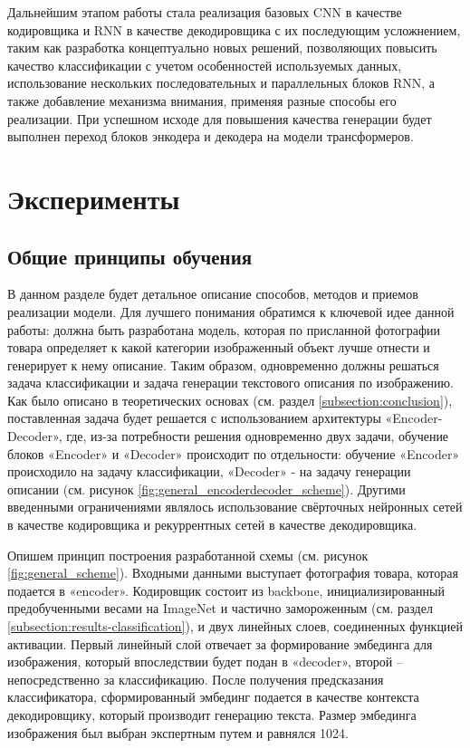 \documentclass[a4paper,12pt]{extarticle}
\begin{document}
Дальнейшим этапом работы стала реализация базовых CNN в качестве кодировщика и RNN в качестве декодировщика с их последующим усложнением, таким как разработка концептуально новых решений, позволяющих повысить качество классификации с учетом особенностей используемых данных, использование нескольких последовательных и параллельных блоков RNN, а также добавление механизма внимания, применяя разные способы его реализации. При успешном исходе для повышения качества генерации будет выполнен переход блоков энкодера и декодера на модели трансформеров.



\newpage
\section{Эксперименты}

\subsection{Общие принципы обучения}

В данном разделе будет детальное описание способов, методов и приемов реализации модели. Для лучшего понимания обратимся к ключевой идее данной работы: должна быть разработана модель, которая по присланной фотографии товара определяет к какой категории изображенный объект лучше отнести и генерирует к нему описание. Таким образом, одновременно должны решаться задача классификации и задача генерации текстового описания по изображению. Как было описано в теоретических основах (см. раздел \ref{subsection:conclusion}), поставленная задача будет решается с использованием архитектуры «Encoder-Decoder», где, из-за потребности решения одновременно двух задачи, обучение блоков «Encoder» и «Decoder» происходит по отдельности: обучение «Encoder» происходило на задачу классификации, «Decoder» - на задачу генерации описании (см. рисунок \ref{fig:general_encoderdecoder_scheme}). Другими введенными ограничениями являлось использование свёрточных нейронных сетей в качестве кодировщика и рекуррентных сетей в качестве декодировщика.

Опишем принцип построения разработанной схемы (см. рисунок \ref{fig:general_scheme}). Входными данными выступает фотография товара, которая подается в «encoder». Кодировщик состоит из backbone, инициализированный предобученными весами на ImageNet и частично замороженным (см. раздел \ref{subsection:results-classification}), и двух линейных слоев, соединенных функцией активации. Первый линейный слой отвечает за формирование эмбединга для изображения, который впоследствии будет подан в «decoder», второй – непосредственно за классификацию. После получения предсказания классификатора, сформированный эмбединг подается в качестве контекста декодировщику, который производит генерацию текста. Размер эмбединга изображения был выбран экспертным путем и равнялся 1024.
\end{document}
